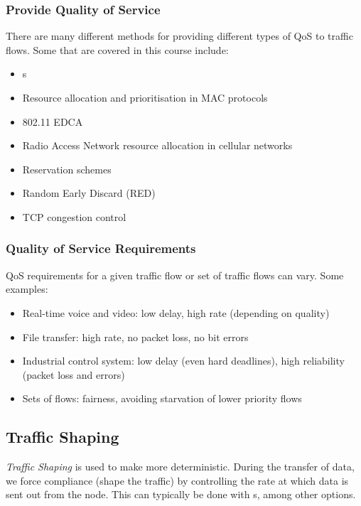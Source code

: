 \subsubsection{Provide Quality of Service}\label{subsubsec:Provide_QoS}
There are many different methods for providing different types of QoS to traffic flows.
Some that are covered in this course include:
\begin{itemize}[noitemsep]
\item {}s
\item Resource allocation and prioritisation in MAC protocols
\item 802.11 EDCA
\item Radio Access Network resource allocation in cellular networks
\item Reservation schemes
\item Random Early Discard (RED)
\item TCP congestion control
\end{itemize}

\subsubsection{Quality of Service Requirements}\label{subsubsec:QoS_Requirements}
QoS requirements for a given traffic flow or set of traffic flows can vary.
Some examples:
\begin{itemize}[noitemsep]
\item Real-time voice and video: low delay, high rate (depending on quality)
\item File transfer: high rate, no packet loss, no bit errors
\item Industrial control system: low delay (even hard deadlines), high reliability (packet loss and errors)
\item Sets of flows: fairness, avoiding starvation of lower priority flows
\end{itemize}

\subsection{Traffic Shaping}\label{subsec:Traffic_Shaping}
\begin{definition}\label{def:Traffic_Shaping}
  \emph{Traffic Shaping} is used to make  more deterministic.
  During the transfer of data, we force compliance (shape the traffic) by controlling the rate at which data is sent out from the node.
  This can typically be done with s, among other options.
\end{definition}

